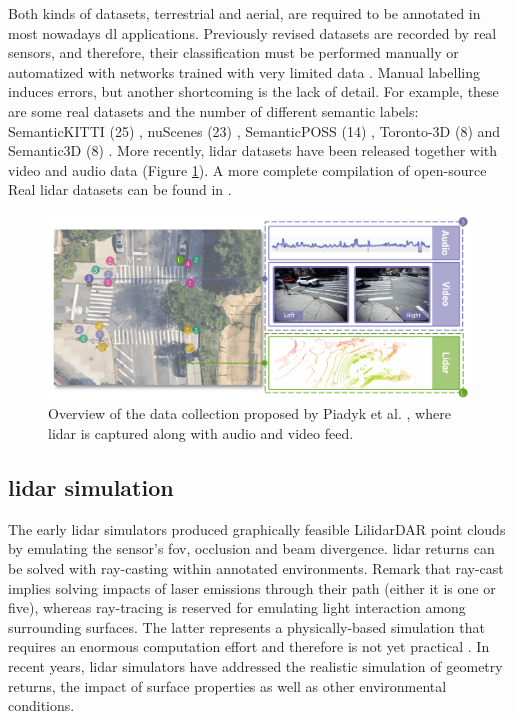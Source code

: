 Both kinds of datasets, terrestrial and aerial, are required to be annotated in most nowadays \acrshort{dl} applications. Previously revised datasets are recorded by real sensors, and therefore, their classification must be performed manually \cite{behley_towards_2021, pan_semanticposs_2020, tan_toronto-3d_2020} or automatized with networks trained with very limited data \cite{wu_squeezesegv2_2019}. Manual labelling induces errors, but another shortcoming is the lack of detail. For example, these are some real datasets and the number of different semantic labels: SemanticKITTI (25) \cite{behley_towards_2021}, nuScenes (23) \cite{caesar_nuscenes_2020}, SemanticPOSS (14) \cite{pan_semanticposs_2020}, Toronto-3D (8) \cite{tan_toronto-3d_2020} and Semantic3D (8) \cite{hackel_semantic3d_2017}. More recently, \acrshort{lidar} datasets have been released together with video and audio data \cite{piadyk_streetaware_2023} (Figure \ref{fig:lidar_audio_video}). A more complete compilation of open-source Real \acrshort{lidar} datasets can be found in \cite{cai_survey_2022}. 

\begin{figure}[ht]
	\includegraphics[width=\linewidth]{figs/context/lidar_dataset_audio_video.png}
	\caption{Overview of the data collection proposed by Piadyk et al. \cite{piadyk_streetaware_2023}, where \acrshort{lidar} is captured along with audio and video feed. }
    \label{fig:lidar_audio_video}
\end{figure}

\subsection{\acrshort{lidar} simulation}

The early \acrshort{lidar} simulators produced graphically feasible Li\acrshort{lidar}DAR point clouds \cite{gschwandtner_blensor_2011} by emulating the sensor's \acrshort{fov}, occlusion and beam divergence. \acrshort{lidar} returns can be solved with ray-casting \cite{ahn_real-time_2020, zhao_method_2021, bechtold_helios_2016} within annotated environments. Remark that ray-cast implies solving impacts of laser emissions through their path (either it is one or five), whereas ray-tracing is reserved for emulating light interaction among surrounding surfaces. The latter represents a physically-based simulation that requires an enormous computation effort and therefore is not yet practical \cite{ahn_real-time_2020}. In recent years, \acrshort{lidar} simulators have addressed the realistic simulation of geometry returns, the impact of surface properties as well as other environmental conditions. 

